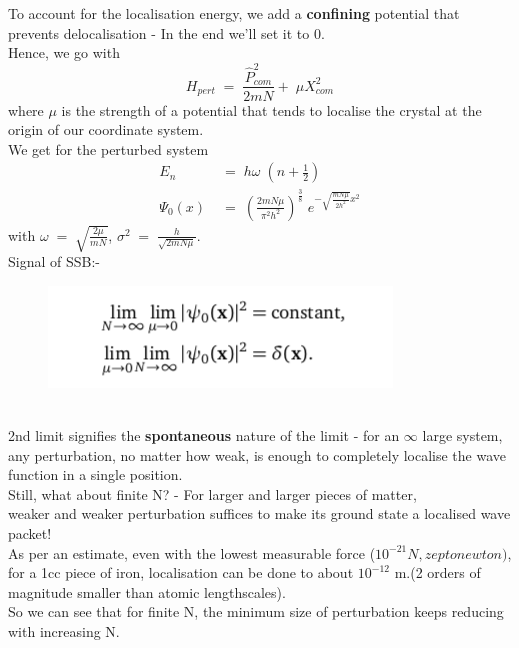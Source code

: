 \documentclass[12pt]{article}
\begin{document}
\newpage
To account for the localisation energy, we add a \textbf{confining} potential that prevents delocalisation - In the end we'll set it to 0.\\
Hence, we go with
\begin{equation}
    H_{pert}\;=\;\frac{\hat{P}^2_{com}}{2mN}+\;\mu X^2_{com}
\end{equation}
where $\mu$ is the strength of a potential that tends to localise the crystal at the origin of our coordinate system. \\
\newline
We get for the perturbed system
\begin{align}
    E_n\;&=\;h\omega\;(n+\frac{1}{2})\\
    \Psi_0(x)\;&=\;(\frac{2mN\mu}{\pi^2h^2})^{\frac{3}{8}}\;e^{\displaystyle{-\sqrt{\frac{mN\mu}{2h^2}}x^2}}
\end{align}
with $\omega\;=\;\sqrt{\displaystyle{\frac{2\mu}{mN}}}$, $\sigma^2\;=\;\displaystyle{\frac{h}{\sqrt{2mN\mu}}}$.\\
Signal of SSB:-
\begin{figure}[h]
    \centering
    \includegraphics[scale=0.7]{Screen Shot 2020-07-22 at 21.55.01.png}
\end{figure}
\\
2nd limit signifies the \textbf{spontaneous} nature of the limit - for an $\infty$ large system, any perturbation, no matter how weak, is enough to completely localise the wave function in a single position.\\
\newline
Still, what about finite N? - For larger and larger pieces of matter,\\
weaker and weaker perturbation suffices to make its ground state a localised wave packet!\\
\newline
As per an estimate, even with the lowest measurable force ($10^{-21}N, zeptonewton)$, for a 1cc piece of iron, localisation can be done to about $10^{-12}$ m.(2 orders of magnitude smaller than atomic lengthscales).\\
\newline
So we can see that for finite N, the minimum size of perturbation keeps reducing with increasing N.
\end{document}

